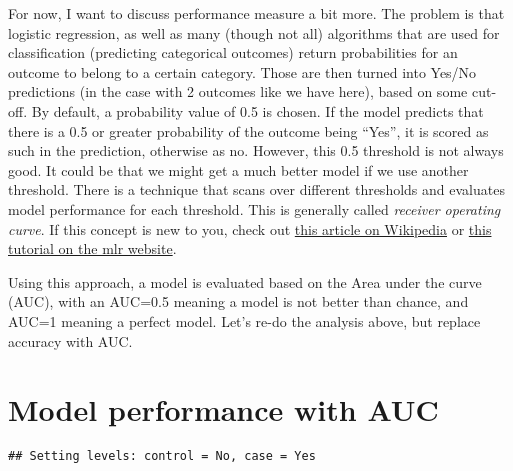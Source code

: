\documentclass[]{article}
\newenvironment{Shaded}{\begin{snugshade}}{\end{snugshade}}
\newcommand{\CommentTok}[1]{\textcolor[rgb]{0.56,0.35,0.01}{\textit{#1}}}
\newcommand{\DecValTok}[1]{\textcolor[rgb]{0.00,0.00,0.81}{#1}}
\newcommand{\KeywordTok}[1]{\textcolor[rgb]{0.13,0.29,0.53}{\textbf{#1}}}
\newcommand{\NormalTok}[1]{#1}
\newcommand{\OperatorTok}[1]{\textcolor[rgb]{0.81,0.36,0.00}{\textbf{#1}}}
\newcommand{\StringTok}[1]{\textcolor[rgb]{0.31,0.60,0.02}{#1}}
\begin{document}
For now, I want to discuss performance measure a bit more. The problem
is that logistic regression, as well as many (though not all) algorithms
that are used for classification (predicting categorical outcomes)
return probabilities for an outcome to belong to a certain category.
Those are then turned into Yes/No predictions (in the case with 2
outcomes like we have here), based on some cut-off. By default, a
probability value of 0.5 is chosen. If the model predicts that there is
a 0.5 or greater probability of the outcome being ``Yes'', it is scored
as such in the prediction, otherwise as no. However, this 0.5 threshold
is not always good. It could be that we might get a much better model if
we use another threshold. There is a technique that scans over different
thresholds and evaluates model performance for each threshold. This is
generally called \emph{receiver operating curve}. If this concept is new
to you, check out
\href{https://en.wikipedia.org/wiki/Receiver_operating_characteristic}{this
article on Wikipedia} or
\href{https://mlr.mlr-org.com/articles/tutorial/roc_analysis.html}{this
tutorial on the mlr website}.

Using this approach, a model is evaluated based on the Area under the
curve (AUC), with an AUC=0.5 meaning a model is not better than chance,
and AUC=1 meaning a perfect model. Let's re-do the analysis above, but
replace accuracy with AUC.

\hypertarget{model-performance-with-auc}{%
\section{Model performance with AUC}\label{model-performance-with-auc}}

\begin{Shaded}
\end{Shaded}

\begin{verbatim}
## Setting levels: control = No, case = Yes
\end{verbatim}
\end{document}
